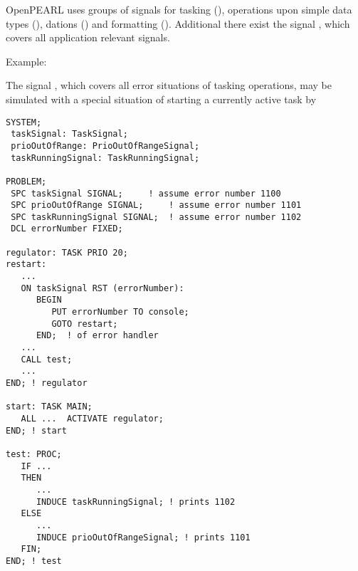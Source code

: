 

OpenPEARL  uses groups of signals for tasking (), 
operations upon simple data types (), 
dations () and formatting ().
 Additional there exist the signal , which covers all
application relevant signals.


Example:

The signal , which covers all error situations of 
tasking operations, may be simulated with a special situation of 
starting a currently active task by 


\begin{lstlisting}
SYSTEM;
 taskSignal: TaskSignal;
 prioOutOfRange: PrioOutOfRangeSignal;
 taskRunningSignal: TaskRunningSignal;
  
PROBLEM;
 SPC taskSignal SIGNAL; 	! assume error number 1100 
 SPC prioOutOfRange SIGNAL;     ! assume error number 1101
 SPC taskRunningSignal SIGNAL;	! assume error number 1102
 DCL errorNumber FIXED;

regulator: TASK PRIO 20;
restart:
   ...
   ON taskSignal RST (errorNumber):
      BEGIN 
         PUT errorNumber TO console;
         GOTO restart;
      END;  ! of error handler 
   ...
   CALL test;
   ...
END; ! regulator

start: TASK MAIN;
   ALL ...  ACTIVATE regulator;
END; ! start

test: PROC;
   IF ... 
   THEN
      ...
      INDUCE taskRunningSignal; ! prints 1102
   ELSE
      ...
      INDUCE prioOutOfRangeSignal; ! prints 1101
   FIN;
END; ! test
\end{lstlisting}

